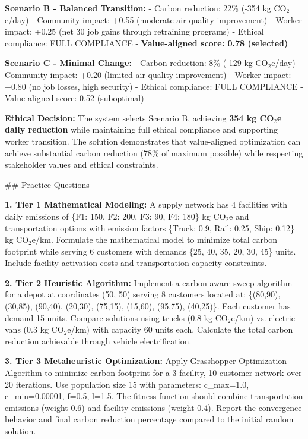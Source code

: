 \documentclass{article}
\begin{document}
\textbf{Scenario B - Balanced Transition:}
- Carbon reduction: 22\% (-354 kg CO$_2$e/day)  
- Community impact: +0.55 (moderate air quality improvement)
- Worker impact: +0.25 (net 30 job gains through retraining programs)
- Ethical compliance: FULL COMPLIANCE
- \textbf{Value-aligned score: 0.78 (selected)}

\textbf{Scenario C - Minimal Change:}
- Carbon reduction: 8\% (-129 kg CO$_2$e/day)
- Community impact: +0.20 (limited air quality improvement)
- Worker impact: +0.80 (no job losses, high security)  
- Ethical compliance: FULL COMPLIANCE
- Value-aligned score: 0.52 (suboptimal)

\textbf{Ethical Decision:} The system selects Scenario B, achieving \textbf{354 kg CO$_2$e daily reduction} while maintaining full ethical compliance and supporting worker transition. The solution demonstrates that value-aligned optimization can achieve substantial carbon reduction (78\% of maximum possible) while respecting stakeholder values and ethical constraints.

## Practice Questions

\textbf{1. Tier 1 Mathematical Modeling:} A supply network has 4 facilities with daily emissions of \{F1: 150, F2: 200, F3: 90, F4: 180\} kg CO$_2$e and transportation options with emission factors \{Truck: 0.9, Rail: 0.25, Ship: 0.12\} kg CO$_2$e/km. Formulate the mathematical model to minimize total carbon footprint while serving 6 customers with demands \{25, 40, 35, 20, 30, 45\} units. Include facility activation costs and transportation capacity constraints.

\textbf{2. Tier 2 Heuristic Algorithm:} Implement a carbon-aware sweep algorithm for a depot at coordinates (50, 50) serving 8 customers located at: \{(80,90), (30,85), (90,40), (20,30), (75,15), (15,60), (95,75), (40,25)\}. Each customer has demand 15 units. Compare solutions using trucks (0.8 kg CO$_2$e/km) vs. electric vans (0.3 kg CO$_2$e/km) with capacity 60 units each. Calculate the total carbon reduction achievable through vehicle electrification.

\textbf{3. Tier 3 Metaheuristic Optimization:} Apply Grasshopper Optimization Algorithm to minimize carbon footprint for a 3-facility, 10-customer network over 20 iterations. Use population size 15 with parameters: c\_max=1.0, c\_min=0.00001, f=0.5, l=1.5. The fitness function should combine transportation emissions (weight 0.6) and facility emissions (weight 0.4). Report the convergence behavior and final carbon reduction percentage compared to the initial random solution.
\end{document}
